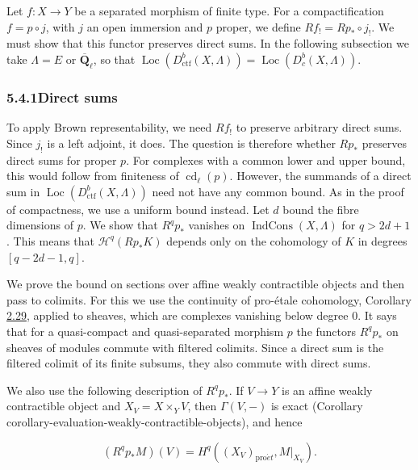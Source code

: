 \documentclass[11pt]{article}
\providecommand{\Dbc}{}\renewcommand{\Dbc}{D^b_c}
\providecommand{\IndCons}{}\renewcommand{\IndCons}{\operatorname{IndCons}}
\providecommand{\Loc}{}\renewcommand{\Loc}{\operatorname{Loc}}
\begin{document}
Let \(f:X\to Y\) be a separated morphism of finite type. For a compactification \(f=p\circ j\), with \(j\) an open immersion and \(p\) proper, we define \(Rf_!=Rp_*\circ j_!\). We must show that this functor preserves direct sums. In the following subsection we take \(\Lambda=E\) or \(\overline{\mathbf Q}_\ell\), so that \(\Loc(D^b_{\mathrm{ctf}}(X,\Lambda))=\Loc(\Dbc(X,\Lambda))\).

\subsubsection*{\texorpdfstring{5.4.1\quad Direct sums}{5.4.1 Direct sums}}
\label{bp461}%
\label{bp462}%
To apply Brown representability, we need \(Rf_!\) to preserve arbitrary direct sums. Since \(j_!\) is a left adjoint, it does. The question is therefore whether \(Rp_*\) preserves direct sums for proper \(p\). For complexes with a common lower and upper bound, this would follow from finiteness of \(\operatorname{cd}_\ell(p)\). However, the summands of a direct sum in \(\Loc(D^b_{\mathrm{ctf}}(X,\Lambda))\) need not have any common bound. As in the proof of compactness, we use a uniform bound instead. Let \(d\) bound the fibre dimensions of \(p\). We show that \(R^qp_*\) vanishes on \(\IndCons(X,\Lambda)\) for \(q>2d+1\). This means that \(\mathcal H^q(Rp_*K)\) depends only on the cohomology of \(K\) in degrees \([q-2d-1,q]\).

We prove the bound on sections over affine weakly contractible objects and then pass to colimits. For this we use the continuity of pro-étale cohomology, Corollary \hyperref[bp86]{2.29}, applied to sheaves, which are complexes vanishing below degree \(0\). It says that for a quasi-compact and quasi-separated morphism \(p\) the functors \(R^qp_*\) on sheaves of modules commute with filtered colimits. Since a direct sum is the filtered colimit of its finite subsums, they also commute with direct sums.

We also use the following description of \(R^qp_*\). If \(V\to Y\) is an affine weakly contractible object and \(X_V=X\times_YV\), then \(\Gamma(V,-)\) is exact (Corollary corollary-evaluation-weakly-contractible-objects), and hence

\[
(R^qp_*M)(V)=H^q((X_V)_{\mathrm{pro}\acute{e}t},M|_{X_V}).
\tag{5.5}
\]
\end{document}
